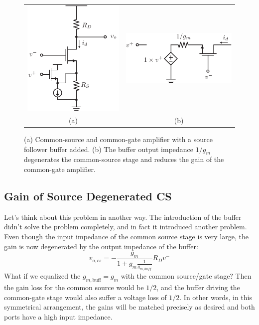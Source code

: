 \begin{figure}[tb]
\begin{center}
\begin{tabular}{cc}
\includegraphics[scale=1]{amp_diff_CS_CG_CD.pdf} &
\includegraphics[scale=1]{amp_CG_CD_Model.pdf} \\
(a) & (b) \\
\end{tabular}
\end{center}
\caption{(a) Common-source and common-gate amplifier with a source follower buffer added.  (b) The buffer output impedance $1/g_m$ degenerates the common-source stage and reduces the gain of the common-gate amplifier.} \label{fig:amp_diff_CS_CG_CD.pdf}
\end{figure}



\subsection{Gain of Source Degenerated CS}


Let's think about this problem in another way.   The introduction of the buffer didn't solve the problem completely, and in fact it introduced another problem.  Even though the input impedance of the common source stage is very large, the gain is now degenerated by the output impedance of the buffer:   
%
\begin{equation}
	v_{o,cs} = -\frac{g_m}{1+g_m \frac{1}{g_{m,buff}} } R_D v^-    
\end{equation}
%
What if we equalized the $g_{m,\text{buff}} = g_m$ with the common source/gate stage?  Then the gain loss for the common source would be $1/2$, and the buffer driving the common-gate stage would also suffer a voltage loss of $1/2$.  In other words, in this symmetrical arrangement, the gains will be matched precisely as desired and both ports have a high input impedance.



